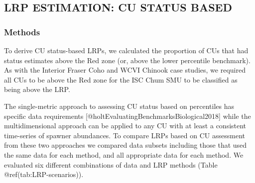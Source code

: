 \documentclass[
]{article}
\begin{document}
\hypertarget{lrp-estimation-cu-status-based}{%
\subsection{LRP ESTIMATION: CU STATUS
BASED}\label{lrp-estimation-cu-status-based}}

\hypertarget{methods}{%
\subsubsection{Methods}\label{methods}}

To derive CU status-based LRPs, we calculated the proportion of CUs that
had status estimates above the Red zone (or, above the lower percentile
benchmark). As with the Interior Fraser Coho and WCVI Chinook case
studies, we required all CUs to be above the Red zone for the ISC Chum
SMU to be classified as being above the LRP.

The single-metric approach to assessing CU status based on percentiles
has specific data requirements
{[}@holtEvaluatingBenchmarksBiological2018{]} while the multidimensional
approach can be applied to any CU with at least a consistent time-series
of spawner abundances. To compare LRPs based on CU assessment from these
two approaches we compared data subsets including those that used the
same data for each method, and all appropriate data for each method. We
evaluated six different combinations of data and LRP methods (Table
@ref(tab:LRP-scenarios)). \needspace{0.35\textheight}
\end{document}
